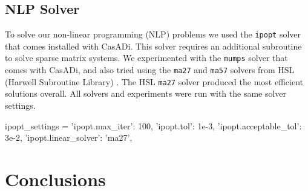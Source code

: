\documentclass[]{article}
\begin{document}
	
	
	\subsection*{NLP Solver}
	To solve our non-linear programming (NLP) problems we used the \texttt{ipopt} solver that comes installed with CasADi.  This solver requires an additional subroutine to  solve sparse matrix systems. We experimented with the \texttt{mumps}  solver that comes with CasADi, and also tried using the  \texttt{ma27} and  \texttt{ma57} solvers  from HSL (Harwell Subroutine Library) \cite{hsl}. The HSL \texttt{ma27} solver produced the most efficient solutions overall. All solvers and experiments were run with the same solver settings.
	\vspace{\baselineskip}
	\begin{python}
        ipopt_settings = {
			'ipopt.max_iter': 100,                  
			'ipopt.tol': 1e-3,                      	
			'ipopt.acceptable_tol': 3e-2,
			'ipopt.linear_solver': 'ma27',
		}
	\end{python}
	
	\section*{Conclusions}
	
	
	
%	


\end{document}
